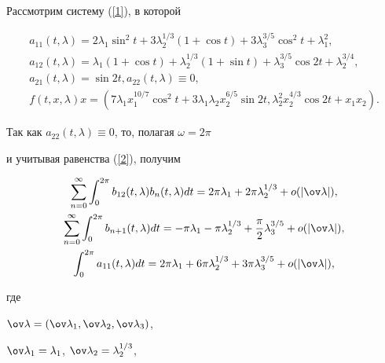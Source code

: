 \begin{examnonum}


Рассмотрим систему (\ref{1}), в которой


\begin{gather*}


a_{11} (t,\lambda)=2\lambda_1 \sin ^2 t+3\lambda_2^{1/3}


(1+\cos t)+3\lambda_3^{3/5} \cos ^2 t+\lambda_1^2, \\


a_{12} (t,\lambda)=\lambda_1 (1+\cos t)+\lambda_2^{1/3}


(1+\sin t)+\lambda_3^{3/5} \cos 2t+\lambda_2^{3/4}, \\


a_{21} (t,\lambda)=\sin 2t,a_{22} (t,\lambda) \equiv 0, \\


f(t,x,\lambda)x=(7\lambda_1 x_1^{10/7} \cos ^2 t+3\lambda_1


\lambda_2 x_2^{6/5} \sin 2t,\lambda_2^2 x_2^{4/3} \cos 2t+x_1 x_2). 


\end{gather*}





Так как $a_{22} (t,\lambda) \equiv 0$, то, полагая $\omega =2\pi$


и учитывая равенства (\ref{2}), получим


\begin{gather*}


\sum_{n=0}^\infty \int_0^{2\pi} b_{12} (t,\lambda)b_n


(t,\lambda)dt=2\pi \lambda_1+2\pi \lambda_2^{1/3}+o(|\ov \lambda |), \\


\sum_{n=0}^\infty \int_0^{2\pi} b_{n+1} (t,\lambda)dt= - \pi \lambda_1 -


\pi \lambda_2^{1/3}+\frac{\pi}{2}\lambda_3^{3/5}+o(|\ov \lambda |), \\


\int_0^{2\pi} a_{11} (t,\lambda)dt=2\pi \lambda_1+6\pi \lambda_2^{1/3}+


3\pi \lambda_3^{3/5}+o(|\ov \lambda |),


\end{gather*}


где


$\ov \lambda =(\ov \lambda_1,\ov \lambda_2,\ov \lambda_3)$,


$\ov \lambda_1 =\lambda_1$, $\ov \lambda_2 =\lambda_2^{1/3}$,



\end{examnonum}
